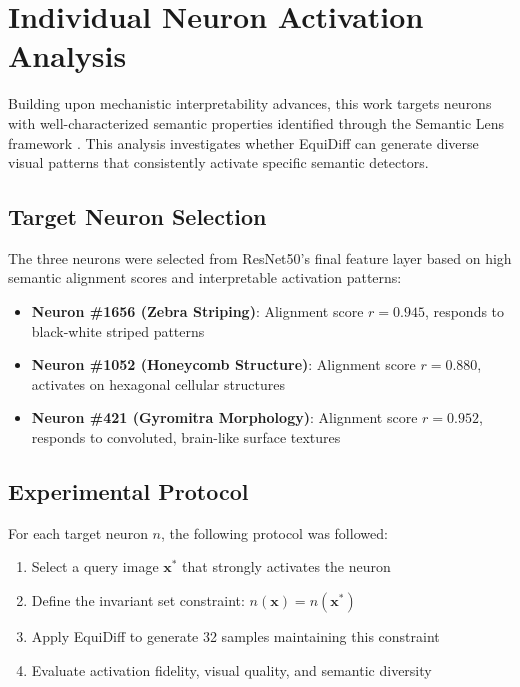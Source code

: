 \documentclass[licencjacka,en]{pracamgr}
\newcommand{\method}[1]{EquiDiff}  %
\begin{document}
\section{Individual Neuron Activation Analysis}

Building upon mechanistic interpretability advances, this work targets neurons with well-characterized semantic properties identified through the Semantic Lens framework \citep{dreyer2025mechanisticunderstandingvalidationlarge}. This analysis investigates whether \method{} can generate diverse visual patterns that consistently activate specific semantic detectors.

\subsection{Target Neuron Selection}

The three neurons were selected from ResNet50's final feature layer based on high semantic alignment scores and interpretable activation patterns:

\begin{itemize}
\item \textbf{Neuron \#1656 (Zebra Striping)}: Alignment score $r = 0.945$, responds to black-white striped patterns
\item \textbf{Neuron \#1052 (Honeycomb Structure)}: Alignment score $r = 0.880$, activates on hexagonal cellular structures  
\item \textbf{Neuron \#421 (Gyromitra Morphology)}: Alignment score $r = 0.952$, responds to convoluted, brain-like surface textures
\end{itemize}

\subsection{Experimental Protocol}

For each target neuron $n$, the following protocol was followed:
\begin{enumerate}
\item Select a query image $\mathbf{x^*}$ that strongly activates the neuron
\item Define the invariant set constraint: $n(\mathbf{x}) = n(\mathbf{x^*})$
\item Apply \method{} to generate 32 samples maintaining this constraint
\item Evaluate activation fidelity, visual quality, and semantic diversity
\end{enumerate}
\end{document}
